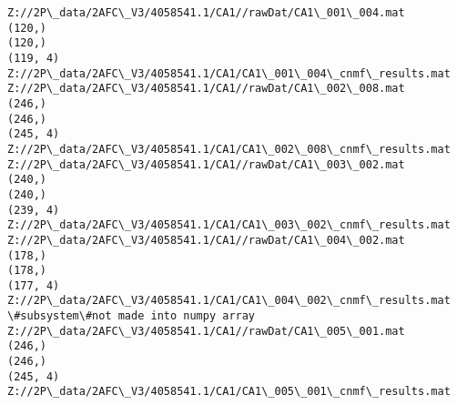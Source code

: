 \documentclass[11pt]{article}
\begin{document}
    \begin{Verbatim}[commandchars=\\\{\}]
Z://2P\_data/2AFC\_V3/4058541.1/CA1//rawDat/CA1\_001\_004.mat
(120,)
(120,)
(119, 4)
Z://2P\_data/2AFC\_V3/4058541.1/CA1/CA1\_001\_004\_cnmf\_results.mat
Z://2P\_data/2AFC\_V3/4058541.1/CA1//rawDat/CA1\_002\_008.mat
(246,)
(246,)
(245, 4)
Z://2P\_data/2AFC\_V3/4058541.1/CA1/CA1\_002\_008\_cnmf\_results.mat
Z://2P\_data/2AFC\_V3/4058541.1/CA1//rawDat/CA1\_003\_002.mat
(240,)
(240,)
(239, 4)
Z://2P\_data/2AFC\_V3/4058541.1/CA1/CA1\_003\_002\_cnmf\_results.mat
Z://2P\_data/2AFC\_V3/4058541.1/CA1//rawDat/CA1\_004\_002.mat
(178,)
(178,)
(177, 4)
Z://2P\_data/2AFC\_V3/4058541.1/CA1/CA1\_004\_002\_cnmf\_results.mat
\#subsystem\#not made into numpy array
Z://2P\_data/2AFC\_V3/4058541.1/CA1//rawDat/CA1\_005\_001.mat
(246,)
(246,)
(245, 4)
Z://2P\_data/2AFC\_V3/4058541.1/CA1/CA1\_005\_001\_cnmf\_results.mat

    \end{Verbatim}
\end{document}
